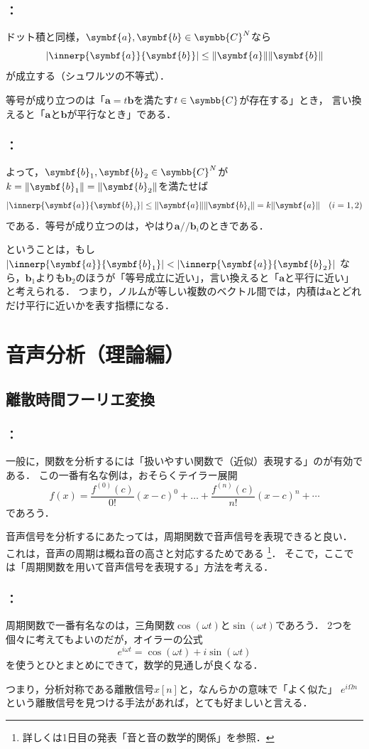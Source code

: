 \documentclass[unicode,11pt]{beamer}
\newcommand{\impact}[1]{\alert{\sffamily #1}}
\newcommand{\numset}[1]{\symbb{#1}}
\DeclarePairedDelimiter{\abs}{\lvert}{\rvert}
\newcommand{\sparallel}{\mathrel{/\!/}}
\newcommand{\vb}[1]{\symbf{#1}}
\DeclarePairedDelimiter{\norm}{\lVert}{\rVert}
\begin{document}
\begin{frame}
  \frametitle{\secname ：\subsecname}
  ドット積と同様，\(\vb{a},\vb{b}\in\numset{C}^N\)なら
  \[
    \abs{\innerp{\vb{a}}{\vb{b}}} \leq \norm{\vb{a}}\norm{\vb{b}}
  \]
  が成立する（シュワルツの不等式）．

  等号が成り立つのは「\(\vb{a}=t\vb{b}\)を満たす\(t\in\numset{C}\)が存在する」とき，
  言い換えると「\(\vb{a}\)と\(\vb{b}\)が平行なとき」である．
\end{frame}

\begin{frame}
  \frametitle{\secname ：\subsecname}
  よって，\(\vb{b}_1,\vb{b}_2\in\numset{C}^N\)が\(k=\norm{\vb{b}_1}=\norm{\vb{b}_2}\)を満たせば
  \[
    \abs{\innerp{\vb{a}}{\vb{b}_i}} \leq \norm{\vb{a}}\norm{\vb{b}_i} = k\norm{\vb{a}}
    \quad\text{(\(i=1,2\))}
  \]
  である．等号が成り立つのは，やはり\(\vb{a}\sparallel\vb{b}_i\)のときである．

  ということは，もし\(\abs{\innerp{\vb{a}}{\vb{b}_1}}<\abs{\innerp{\vb{a}}{\vb{b}_2}}\)
  なら，\(\vb{b}_1\)よりも\(\vb{b}_2\)のほうが「等号成立に近い」，言い換えると「\(\vb{a}\)と平行に近い」と考えられる．
  つまり，ノルムが等しい複数のベクトル間では，内積は\(\vb{a}\)と\impact{どれだけ平行に近いかを表す指標}になる．
\end{frame}

\section{音声分析（理論編）}
\subsection{離散時間フーリエ変換}
\begin{frame}
  \frametitle{\secname ：\subsecname}
  一般に，関数を分析するには「扱いやすい関数で（近似）表現する」のが有効である．
  この一番有名な例は，おそらくテイラー展開
  \[
    f(x) = \frac{f^{(0)}(c)}{0!}(x-c)^0+\dots+\frac{f^{(n)}(c)}{n!}(x-c)^n+\dotsb
  \]
  であろう．

  音声信号を分析するにあたっては，周期関数で音声信号を表現できると良い．
  これは，\impact{音声の周期は概ね音の高さと対応する}ためである
  \footnote{詳しくは1日目の発表「音と音の数学的関係」を参照．}．
  そこで，ここでは「周期関数を用いて音声信号を表現する」方法を考える．
\end{frame}

\begin{frame}
  \frametitle{\secname ：\subsecname}
  周期関数で一番有名なのは，三角関数\(\cos(\omega t)\)と\(\sin(\omega t)\)であろう．
  2つを個々に考えてもよいのだが，オイラーの公式
  \[
    e^{i\omega t} = \cos(\omega t)+i\sin(\omega t)
  \]
  を使うとひとまとめにできて，数学的見通しが良くなる．

  つまり，分析対称である離散信号\(x[n]\)と，なんらかの意味で「よく似た」
  \(e^{i\Omega n}\)という離散信号を見つける手法があれば，とても好ましいと言える．
\end{frame}
\end{document}
